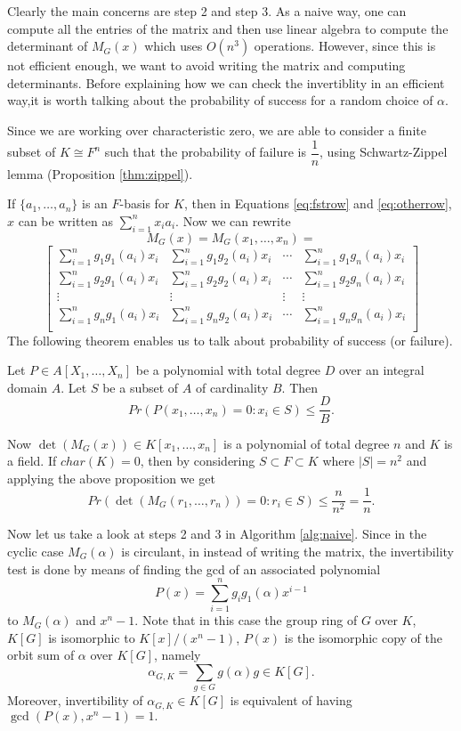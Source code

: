 \documentclass[sigconf]{acmart}
\newcommand{\osum}[2]{\alpha_{#1,#2}}
\theoremstyle{acmplain}
\begin{document}
 Clearly the main concerns are step 2 and step 3. As a naive way, one can compute all the entries of the matrix and then 
 use linear algebra to compute the determinant of $M_G(x)$ which uses $O(n^3)$ operations. However, since this is not efficient
 enough, we want to avoid writing the matrix and computing determinants. Before explaining how we can check the invertiblity 
 in an efficient way,it is worth talking about the probability of success for a random choice of $\alpha$.
 
 Since we are working over characteristic zero, we are able to consider a finite subset
 of $K \cong F^n$ such that the probability of failure is $\dfrac{1}{n}$, using 
 Schwartz-Zippel lemma (Proposition \ref{thm:zippel}).
 
 If $\lbrace a_1, \ldots , a_n \rbrace$ is an $F$-basis for $K$, then in Equations
   \ref{eq:fstrow} and \ref{eq:otherrow}, $x$ can be written as $\sum_{i = 1}^nx_i
    a_i$. Now we can rewrite 
    $$
M_G(x) = M_G(x_1,\ldots,x_n) =  $$
$$
\begin{bmatrix}
\sum_{i = 1}^n g_1 g_1(a_i)x_i & \sum_{i = 1}^n g_1 g_2(a_i)x_i & \cdots & 
\sum_{i = 1}^n g_1 g_n(a_i)x_i \\
\sum_{i = 1}^n g_2 g_1(a_i)x_i & \sum_{i = 1}^n g_2 g_2(a_i)x_i & \cdots & 
\sum_{i = 1}^n g_2 g_n(a_i)x_i \\
\vdots		& \vdots	& \vdots & \vdots \\
\sum_{i = 1}^n g_n g_1(a_i)x_i & \sum_{i = 1}^n g_n g_2(a_i)x_i & \cdots & 
\sum_{i = 1}^n g_n g_n(a_i)x_i \\
\end{bmatrix}    
    $$ 
 The following theorem enables us to talk about probability of success (or failure).
 \begin{proposition}\cite[Proposition 98]{Zippel} \label{thm:zippel}
Let $P \in A[X_1, \ldots, X_n]$ be a polynomial with total degree $D$ over an integral domain $A$. Let $S$ be a subset of $A$ of cardinality $B$. Then $$Pr(P(x_1, \ldots , x_n)=0:x_i \in S) \leq \dfrac{D}{B}.$$
\end{proposition}

Now $\det(M_G(x)) \in K[x_1, \ldots , x_n]$ is a polynomial of total degree $n$ and $K$ is a field. If $char(K) =0$, then by considering $S \subset F \subset K$ where $|S| = n^2$ and applying the above proposition we get $$Pr(\det(M_G(r_1,\ldots , r_n)) = 0 : r_i \in S)\leq \dfrac{n}{n^2}= \dfrac{1}{n}.$$
 
Now let us take a look at steps 2 and 3 in Algorithm \ref{alg:naive}. Since in the cyclic case $M_G(\alpha)$ is circulant,
 in \cite{Giesbrecht} instead of writing the matrix, the invertibility test is done by means of finding the gcd of an 
 associated polynomial 
$$P(x) = \sum_{i = 1}^n g_ig_1(\alpha)x^{i-1}$$ 
 to $M_G(\alpha)$ and $x^n-1$. Note that in this case the group ring of $G$ over $K$, $K[G]$ is isomorphic to $K[x]/(x^n-1)$,
 $P(x)$ is the isomorphic copy of the orbit sum of $\alpha$ over $K[G]$, namely
 $$\alpha_{G,K} = \sum_{g \in G} g(\alpha)g \in K[G].$$
 Moreover, invertibility of $\osum{G}{K}\in K[G]$ is equivalent of having $\gcd (P(x),x^n-1) =1.$
 
\end{document}
